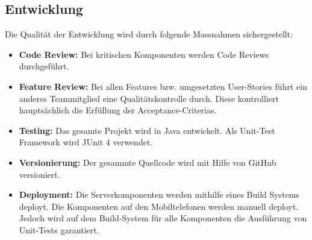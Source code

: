 \subsection{Entwicklung}
Die Qualität der Entwicklung wird durch folgende Massnahmen sichergestellt:
\begin{itemize}
	\item{\textbf{Code Review:} Bei kritischen Komponenten werden Code Reviews durchgeführt.}
	
	\item{\textbf{Feature Review:} Bei allen Features bzw. umgesetzten User-Stories führt ein anderes Teammitglied eine Qualitätskontrolle durch. Diese kontrolliert hauptsächlich die Erfüllung der Acceptance-Criterias.}
	
	\item{\textbf{Testing:} Das gesamte Projekt wird in Java entwickelt. Als Unit-Test Framework wird JUnit 4 verwendet.}
	
	\item{\textbf{Versionierung:} Der gesammte Quellcode wird mit Hilfe von GitHub versioniert.}
	
	\item{\textbf{Deployment:} Die Serverkomponenten werden mithilfe eines Build Systems deployt. Die Komponenten auf den Mobiltelefonen werden manuell deployt. Jedoch wird auf dem Build-System für alle Komponenten die Ausführung von Unit-Tests garantiert.}
	
\end{itemize}

\newpage
